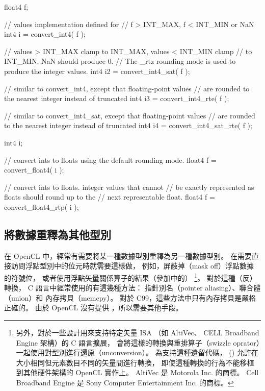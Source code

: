 \startexample
\startclc
float4 f;

// values implementation defined for
// f > INT_MAX, f < INT_MIN or NaN
int4	i = convert_int4( f );

// values > INT_MAX clamp to INT_MAX, values < INT_MIN clamp
// to INT_MIN. NaN should produce 0.
// The _rtz rounding mode is used to produce the integer values.
int4	i2 = convert_int4_sat( f );

// similar to convert_int4, except that floating-point values
// are rounded to the nearest integer instead of truncated
int4	i3 = convert_int4_rte( f );

// similar to convert_int4_sat, except that floating-point values
// are rounded to the nearest integer instead of truncated
int4	i4 = convert_int4_sat_rte( f );
\stopclc
\stopexample

\startexample
\startclc
int4	i;

// convert ints to floats using the default rounding mode.
float4 f = convert_float4( i );

// convert ints to floats. integer values that cannot
// be exactly represented as floats should round up to the
// next representable float.
float4 f = convert_float4_rtp( i );
\stopclc
\stopexample

\subsection[sec:reinterpret]{將數據重釋為其他型別}

在 OpenCL 中，經常有需要將某一種數據型別重釋為另一種數據型別。
在需要直接訪問浮點型別中的位元時就需要這樣做，
例如，屏蔽掉（mask off）浮點數據的符號位，
或者使用浮點矢量關係算子的結果（參加中的）
\footnote{另外，對於一些設計用來支持特定矢量 ISA
（如 AltiVec、 CELL Broadband Engine 架構）的 C 語言擴展，
會將這樣的轉換與重排算子（swizzle oprator）一起使用對型別進行還原（unconversion）。
為支持這種遺留代碼， () 允許在大小相同但元素數目不同的矢量間進行轉換，
即使這種轉換的行為不能移植到其他硬件架構的 OpenCL 實作上。
 AltiVec 是 Motorola Inc. 的商標。
 Cell Broadband Engine 是 Sony Computer Entertainment Inc. 的商標。}。
對於這種（反）轉換， C 語言中經常使用的有這幾種方法：
指針別名（pointer aliasing）、聯合體（union）和 內存拷貝（memcpy）。
對於 C99，這些方法中只有內存拷貝是嚴格正確的。
由於 OpenCL 沒有提供 ，所以需要其他手段。

